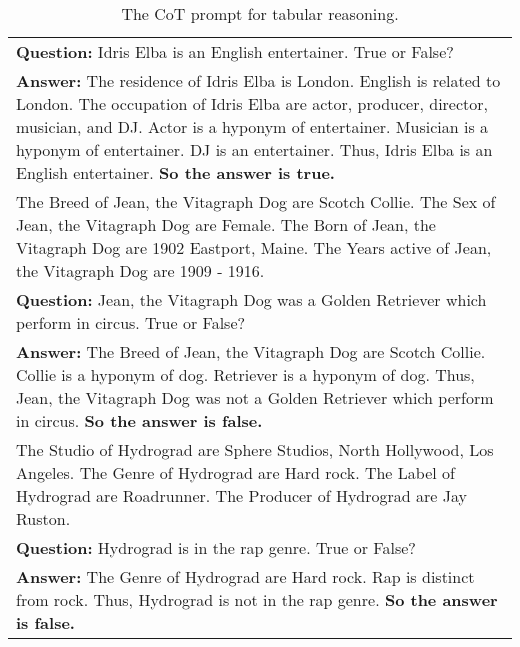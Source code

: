 \begin{table*}
{\begin{tabular}{m{1.0\linewidth}}
{\bf Question:} Idris Elba is an English entertainer. True or False?\\
{\bf Answer:} The residence of Idris Elba is London. English is related to London. The occupation of Idris Elba are actor, producer, director, musician, and DJ. Actor is a hyponym of entertainer. Musician is a hyponym of entertainer. DJ is an entertainer. Thus, Idris Elba is an English entertainer. {\bf So the answer is true.} \\
The Breed of Jean, the Vitagraph Dog are Scotch Collie.  The Sex of Jean, the Vitagraph Dog are Female.  The Born of Jean, the Vitagraph Dog are 1902 Eastport, Maine.  The Years active of Jean, the Vitagraph Dog are 1909 - 1916. \bigstrut[t] \\
{\bf Question:} Jean, the Vitagraph Dog was a Golden Retriever which perform in circus. True or False?\\
{\bf Answer:} The Breed of Jean, the Vitagraph Dog are Scotch Collie. Collie is a hyponym of dog. Retriever is a hyponym of dog. Thus, Jean, the Vitagraph Dog was not a Golden Retriever which perform in circus. {\bf So the answer is false.}\\
The Studio of Hydrograd are Sphere Studios, North Hollywood, Los Angeles.  The Genre of Hydrograd are Hard rock.  The Label of Hydrograd are Roadrunner.  The Producer of Hydrograd are Jay Ruston. \bigstrut[t]\\
{\bf Question:} Hydrograd is in the rap genre. True or False?\\
{\bf Answer:} The Genre of Hydrograd are Hard rock. Rap is distinct from rock. Thus, Hydrograd is not in the rap genre. {\bf So the answer is false.} \bigstrut[b]\\
\hline
\end{tabular}}
\caption{The CoT prompt for tabular reasoning.
}
\label{table:tabular-prompt}
\end{table*} 